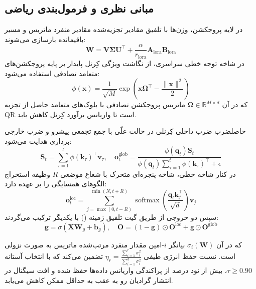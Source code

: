 \subsection{مبانی نظری و فرمول‌بندی ریاضی}
در لایه پروجکشن، وزن‌ها با تلفیق مقادیر تجزیه‌شده مقادیر منفرد ماتریس و مسیر باقیمانده بازسازی می‌شوند:
\begin{equation}
\mathbf{W} = \mathbf{V} \mathbf{\Sigma} \mathbf{U}^\top + \frac{\alpha}{r_{\text{lora}}} \mathbf{A}_{\text{lora}} \mathbf{B}_{\text{lora}}
\end{equation}
در شاخه توجه خطی سراسری، از نگاشت ویژگی کِرنل پایدار بر پایه پروجکشن‌های متعامد تصادفی استفاده می‌شود:
\begin{equation}
\phi(\mathbf{x}) = \frac{1}{\sqrt{M}} \exp\left( \mathbf{x} \mathbf{\Omega}^\top - \frac{\|\mathbf{x}\|^2}{2} \right)
\end{equation}
که در آن $\mathbf{\Omega} \in \mathbb{R}^{M \times d}$ ماتریس پروجکشن تصادفی با بلوک‌های متعامد حاصل از تجزیه QR است تا واریانس برآورد کِرنل کاهش یابد.

حاصلضرب ضرب داخلی کِرنلی در حالت علّی با جمع تجمعی پیشرو و ضرب خارجی برداری هدایت می‌شود:
\begin{equation}
\mathbf{S}_t = \sum_{\tau=1}^t \phi(\mathbf{k}_\tau)^\top \mathbf{v}_\tau, \quad \mathbf{o}_t^{\text{glob}} = \frac{\phi(\mathbf{q}_t) \mathbf{S}_t}{\phi(\mathbf{q}_t) \sum_{\tau=1}^t \phi(\mathbf{k}_\tau)^\top + \epsilon}
\end{equation}
در کنار شاخه خطی، شاخه پنجره‌ای متحرک با شعاع موضعی $R$ وظیفه استخراج الگوهای همسایگی را بر عهده دارد:
\begin{equation}
\mathbf{o}_t^{\text{loc}} = \sum_{j=\max(0, t-R)}^{\min(N, t+R)} \operatorname{softmax}\left(\frac{\mathbf{q}_t \mathbf{k}_j^\top}{\sqrt{d}}\right) \mathbf{v}_j
\end{equation}
سپس دو خروجی از طریق گیت تلفیق زمینه () با یکدیگر ترکیب می‌گردند:
\begin{equation}
\mathbf{g} = \sigma(\mathbf{X} \mathbf{W}_g + \mathbf{b}_g), \quad \mathbf{O} = (1 - \mathbf{g}) \odot \mathbf{O}^{\text{loc}} + \mathbf{g} \odot \mathbf{O}^{\text{glob}}
\end{equation}

که در آن $\sigma_i(\mathbf{W})$ بیانگر $i$-امین مقدار منفرد مرتب‌شده ماتریس به صورت نزولی است. نسبت حفظ انرژی طیفی $\eta_r = \frac{\sum_{i=1}^r \sigma_i^2}{\sum_{i=1}^{d} \sigma_i^2}$ تضمین می‌کند که با انتخاب آستانه $\tau \ge 0.90$، بیش از نود درصد از پراکندگی واریانس داده‌ها حفظ شده و افت سیگنال در انتشار گرادیان رو به عقب به حداقل ممکن کاهش می‌یابد.

